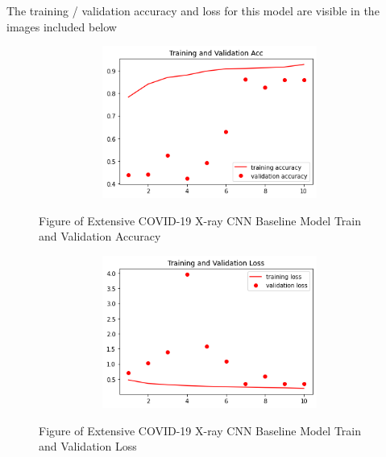 The training / validation accuracy and loss for this model are visible in the images included below
 \begin{figure}[H]
    \centering
    \includegraphics[width=1\textwidth,height=5cm,keepaspectratio]{Images/ExtensiveCOVID19XRayCNNBaselineModelAcc.png}\\
    \caption{Figure of Extensive COVID-19 X-ray CNN Baseline Model Train and Validation Accuracy}
    \label{fig:Extensive COVID-19 X-ray CNN Baseline ModelTrain and Validation Accuracy}
\end{figure}
 \begin{figure}[H]
    \centering
    \includegraphics[width=1\textwidth,height=5cm,keepaspectratio]{Images/ExtensiveCOVID19XRayCNNBaselineModelLoss.png}\\
    \caption{Figure of Extensive COVID-19 X-ray CNN Baseline Model Train and Validation Loss}
    \label{fig:Extensive COVID-19 X-ray CNN Baseline ModelTrain and Validation Loss}
\end{figure}
